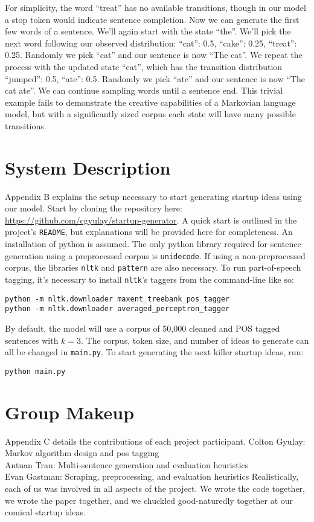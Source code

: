 \documentclass[11pt]{article}
\begin{document}
For simplicity, the word ``treat'' has no available transitions, though in our model a stop token would indicate sentence completion. Now we can generate the first few words of a sentence. We'll again start with the state ``the''. We'll pick the next word following our observed distribution: ``cat'': 0.5, ``cake'': 0.25, ``treat'': 0.25. Randomly we pick ``cat'' and our sentence is now ``The cat''. We repeat the process with the updated state ``cat'', which has the transition distribution ``jumped'': 0.5, ``ate'': 0.5. Randomly we pick ``ate'' and our sentence is now ``The cat ate''. We can continue sampling words until a sentence end. This trivial example fails to demonstrate the creative capabilities of a Markovian language model, but with a significantly sized corpus each state will have many possible transitions.

\section{System Description}

Appendix B explains the setup necessary to start generating startup ideas using our model. Start by cloning the repository here: \url{https://github.com/cgyulay/startup-generator}. A quick start is outlined in the project's \texttt{README}, but explanations will be provided here for completeness. An installation of python is assumed. The only python library required for sentence generation using a preprocessed corpus is \texttt{unidecode}. If using a non-preprocessed corpus, the libraries \texttt{nltk} and \texttt{pattern} are also necessary. To run part-of-speech tagging, it's necessary to install \texttt{nltk}'s taggers from the command-line like so:
\begin{lstlisting}
python -m nltk.downloader maxent_treebank_pos_tagger
python -m nltk.downloader averaged_perceptron_tagger
\end{lstlisting}
By default, the model will use a corpus of 50,000 cleaned and POS tagged sentences with \(k=3\). The corpus, token size, and number of ideas to generate can all be changed in \texttt{main.py}. To start generating the next killer startup ideas, run:
\begin{lstlisting}
python main.py
\end{lstlisting}

\section{Group Makeup}
Appendix C details the contributions of each project participant.\newline\newline
Colton Gyulay: Markov algorithm design and pos tagging\\
Antuan Tran: Multi-sentence generation and evaluation heuristics\\
Evan Gastman: Scraping, preprocessing, and evaluation heuristics\newline\newline
Realistically, each of us was involved in all aspects of the project. We wrote the code together, we wrote the paper together, and we chuckled good-naturedly together at our comical startup ideas.

 

\end{document}

